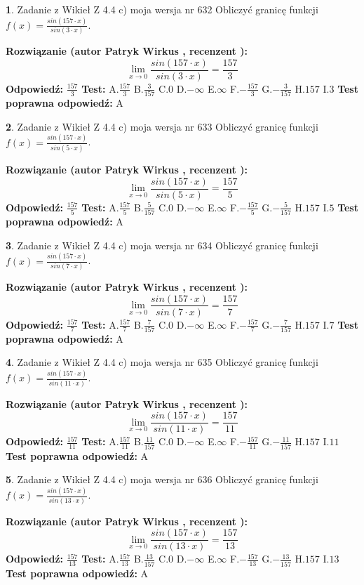 \documentclass[12pt, a4paper]{article}
\theoremstyle{definition} %
\newtheorem{zad}{}
\newcommand{\zadStart}[1]{\begin{zad}#1\newline}
\newcommand{\zadStop}{\end{zad}}
\newcommand{\rozwStart}[2]{\noindent \textbf{Rozwiązanie (autor #1 , recenzent #2): }\newline}
\newcommand{\rozwStop}{\newline}
\newcommand{\odpStart}{\noindent \textbf{Odpowiedź:}\newline}
\newcommand{\odpStop}{\newline}
\newcommand{\testStart}{\noindent \textbf{Test:}\newline}
\newcommand{\testStop}{\newline}
\newcommand{\kluczStart}{\noindent \textbf{Test poprawna odpowiedź:}\newline}
\newcommand{\kluczStop}{\newline}
\begin{document}
\zadStart{Zadanie z Wikieł Z 4.4 c) moja wersja nr 632}
Obliczyć granicę funkcji $f(x)=\frac{sin(157\cdot x)}{sin(3\cdot x)}$.
\zadStop
\rozwStart{Patryk Wirkus}{}
$$\lim\limits_{x\to 0}\frac{sin(157\cdot x)}{sin(3\cdot x)}=
\frac{157}{3}$$
\rozwStop
\odpStart
$\frac{157}{3}$
\odpStop
\testStart
A.$\frac{157}{3}$
B.$\frac{3}{157}$
C.$0$
D.$-\infty$
E.$\infty$
F.$-\frac{157}{3}$
G.$-\frac{3}{157}$
H.$157$
I.$3$
\testStop
\kluczStart
A
\kluczStop



\zadStart{Zadanie z Wikieł Z 4.4 c) moja wersja nr 633}
Obliczyć granicę funkcji $f(x)=\frac{sin(157\cdot x)}{sin(5\cdot x)}$.
\zadStop
\rozwStart{Patryk Wirkus}{}
$$\lim\limits_{x\to 0}\frac{sin(157\cdot x)}{sin(5\cdot x)}=
\frac{157}{5}$$
\rozwStop
\odpStart
$\frac{157}{5}$
\odpStop
\testStart
A.$\frac{157}{5}$
B.$\frac{5}{157}$
C.$0$
D.$-\infty$
E.$\infty$
F.$-\frac{157}{5}$
G.$-\frac{5}{157}$
H.$157$
I.$5$
\testStop
\kluczStart
A
\kluczStop



\zadStart{Zadanie z Wikieł Z 4.4 c) moja wersja nr 634}
Obliczyć granicę funkcji $f(x)=\frac{sin(157\cdot x)}{sin(7\cdot x)}$.
\zadStop
\rozwStart{Patryk Wirkus}{}
$$\lim\limits_{x\to 0}\frac{sin(157\cdot x)}{sin(7\cdot x)}=
\frac{157}{7}$$
\rozwStop
\odpStart
$\frac{157}{7}$
\odpStop
\testStart
A.$\frac{157}{7}$
B.$\frac{7}{157}$
C.$0$
D.$-\infty$
E.$\infty$
F.$-\frac{157}{7}$
G.$-\frac{7}{157}$
H.$157$
I.$7$
\testStop
\kluczStart
A
\kluczStop



\zadStart{Zadanie z Wikieł Z 4.4 c) moja wersja nr 635}
Obliczyć granicę funkcji $f(x)=\frac{sin(157\cdot x)}{sin(11\cdot x)}$.
\zadStop
\rozwStart{Patryk Wirkus}{}
$$\lim\limits_{x\to 0}\frac{sin(157\cdot x)}{sin(11\cdot x)}=
\frac{157}{11}$$
\rozwStop
\odpStart
$\frac{157}{11}$
\odpStop
\testStart
A.$\frac{157}{11}$
B.$\frac{11}{157}$
C.$0$
D.$-\infty$
E.$\infty$
F.$-\frac{157}{11}$
G.$-\frac{11}{157}$
H.$157$
I.$11$
\testStop
\kluczStart
A
\kluczStop



\zadStart{Zadanie z Wikieł Z 4.4 c) moja wersja nr 636}
Obliczyć granicę funkcji $f(x)=\frac{sin(157\cdot x)}{sin(13\cdot x)}$.
\zadStop
\rozwStart{Patryk Wirkus}{}
$$\lim\limits_{x\to 0}\frac{sin(157\cdot x)}{sin(13\cdot x)}=
\frac{157}{13}$$
\rozwStop
\odpStart
$\frac{157}{13}$
\odpStop
\testStart
A.$\frac{157}{13}$
B.$\frac{13}{157}$
C.$0$
D.$-\infty$
E.$\infty$
F.$-\frac{157}{13}$
G.$-\frac{13}{157}$
H.$157$
I.$13$
\testStop
\kluczStart
A
\kluczStop
\end{document}
